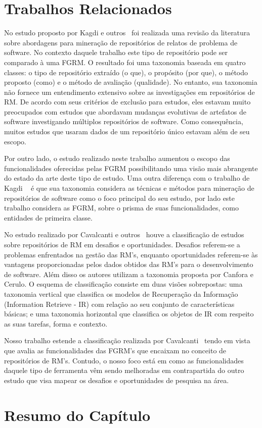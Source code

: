 \section{Trabalhos Relacionados}
\label{sec:map_trabalhos_relacionados}

No estudo proposto por Kagdi e outros~\cite{kagdi2012assigning} foi realizada
uma revisão da literatura sobre abordagens para mi\-ne\-ra\-ção de repositórios de
relatos de problema de software. No contexto daquele trabalho este tipo de
repositório pode ser comparado à uma FGRM\@. O resultado foi uma taxonomia
baseada em quatro classes: o tipo de repositório extraído (o que), o propósito
(por que), o método proposto (como) e o método de avaliação (qualidade). No
entanto, sua taxonomia não fornece um entendimento extensivo sobre as
investigações em repositórios de RM. De acordo com seus critérios de exclusão
para estudos, eles estavam muito preocupados com estudos que abordavam mudanças
evolutivas de artefatos de software investigando múltiplos repositórios de
software. Como consequência, muitos estudos que usaram dados de um repositório
único estavam além de seu escopo.

Por outro lado, o estudo realizado neste trabalho aumentou o escopo das
funcionalidades oferecidas pelas FGRM possibilitando uma visão mais abrangente
do estado da arte deste tipo de estudo. Uma outra diferença com o trabalho de
Kagdi ~\cite{kagdi2012assigning} é que sua taxonomia considera as técnicas e
métodos para mineração de repositórios de software como o foco principal do seu
estudo, por lado este trabalho considera as FGRM, sobre o prisma de suas
funcionalidades, como entidades de primeira classe.

No estudo realizado por Cavalcanti e outros~\cite{cavalcanti2014challenges}
houve a classificação de estudos sobre repositórios de RM em desafios e
oportunidades.  Desafios referem-se a problemas enfrentados na gestão das RM's,
enquanto oportunidades referem-se às vantagens proporcionadas pelos dados
obtidos das  RM's para o desenvolvimento de software. Além disso os autores
utilizam a taxonomia proposta por Canfora e Cerulo\cite{cerulo2004taxonomy}. O
esquema de classificação consiste em duas visões sobrepostas: uma taxonomia
vertical que classifica os modelos de Recuperação da Informação (Information
Retrieve - IR) com relação ao seu conjunto de características básicas; e uma
taxonomia horizontal que classifica os objetos de IR com respeito as suas
tarefas, forma e contexto.

Nosso trabalho estende a classificação realizada por
Cavalcanti~\cite{cavalcanti2014challenges} tendo em vista que avalia as
funcionalidades das FGRM's  que encaixam no conceito de repositórios de RM's.
Contudo, o nosso foco está em como as funcionalidades daquele tipo de ferramenta
vêm sendo melhoradas em contrapartida do outro estudo que visa mapear os
desafios e oportunidades de pesquisa na área.

\section{Resumo do Capítulo}
\label{sec:resumo_capitulo}